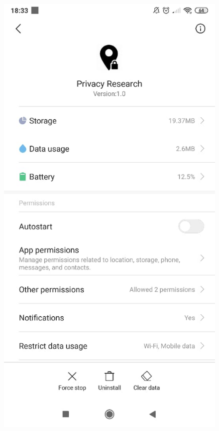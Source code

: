 \begin{figure}
	\centering
	\begin{minipage}{.45\textwidth}
		\begin{center}
		\includegraphics[width=\textwidth]{data/data-usage/data-usage6.jpeg}

\end{center}
\end{minipage}
\end{figure}
